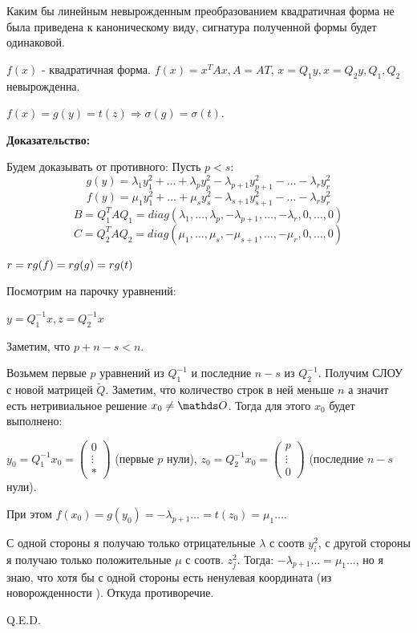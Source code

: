 Каким бы линейным невырожденным преобразованием квадратичная форма не была приведена к каноническому виду, сигнатура полученной формы будет одинаковой.

$f(x)$ - квадратичная форма. $f(x) = x^TAx, A= AT$, $x= Q_1 y, x = Q_2y, Q_1,Q_2$ невырожденна.

$f(x) = g(y) = t(z) \Rightarrow \sigma(g) = \sigma(t)$.

\textbf{Доказательство:}

Будем доказывать от противного: Пусть $p<s$:
$$g(y) = \lambda_1 y_1^2 + \ldots + \lambda_p y_p^2 - \lambda_{p+1} y_{p+1}^2 - \ldots - \lambda_r y_r^2$$
$$f(y) = \mu_1 y_1^2 + \ldots + \mu_s y_s^2 - \lambda_{s+1} y_{s+1}^2 - \ldots - \lambda_r y_r^2$$
$$B = Q_1^TAQ_1 = diag(\lambda_1,\ldots,\lambda_p, -\lambda_{p+1},\ldots, -\lambda_r, 0 ,\ldots,0)$$
$$C = Q_2^TAQ_2 = diag(\mu_1,\ldots,\mu_s, -\mu_{s+1},\ldots, -\mu_r, 0 ,\ldots,0)$$

$r = rg(f) = rg (g) = rg(t)$

Посмотрим на парочку уравнений:

$y = Q^{-1}_1x, z = Q_2^{-1}x$

Заметим, что $p+n-s < n$.

Возьмем первые $p$ уравнений из $Q^{-1}_1$ и последние $n-s$ из $Q_2^{-1}$. Получим СЛОУ с новой матрицей $\tilde{Q}$. Заметим, что количество строк в ней меньше $n$ а значит есть нетривиальное решение $x_0 \neq \zero$. Тогда для этого $x_0$ будет выполнено:

$y_0 = Q^{-1}_1x_0 = \begin{pmatrix}
    0\\
    \vdots\\
    *
\end{pmatrix}$ (первые $p$ нули), \quad
$z_0 = Q^{-1}_2x_0 = \begin{pmatrix}
    p\\
    \vdots\\
    0
\end{pmatrix}$ (последние $n-s$ нули).

При этом $f(x_0) = g(y_0) = -\lambda_{p+1} \ldots = t(z_0)=\mu_1 \ldots $.

С одной стороны я получаю только отрицательные $\lambda$ с соотв $y_i^2$, с другой стороны я получаю только положительные $\mu$ с соотв. $z_j^2$. Тогда:
 $-\lambda_{p+1} \ldots = \mu_1 \ldots $, но я знаю, что хотя бы с одной стороны есть ненулевая координата (из новорожденности ). Откуда противоречие.

\hfill Q.E.D.


